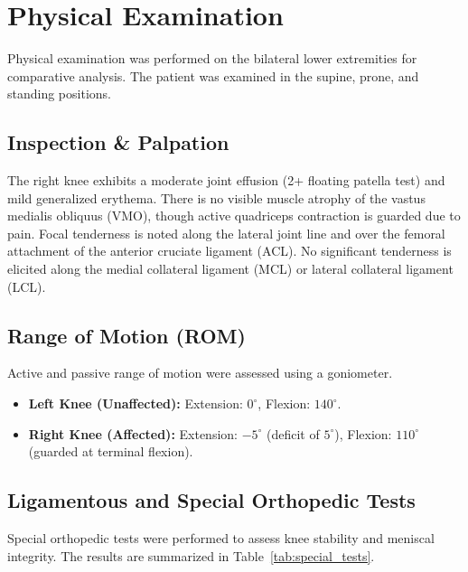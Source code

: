 \section{Physical Examination}
\label{sec:phys_exam}

Physical examination was performed on the bilateral lower extremities for comparative analysis. The patient was examined in the supine, prone, and standing positions.

\subsection{Inspection \& Palpation}
The right knee exhibits a moderate joint effusion (2+ floating patella test) and mild generalized erythema. There is no visible muscle atrophy of the vastus medialis obliquus (VMO), though active quadriceps contraction is guarded due to pain. Focal tenderness is noted along the lateral joint line and over the femoral attachment of the anterior cruciate ligament (ACL). No significant tenderness is elicited along the medial collateral ligament (MCL) or lateral collateral ligament (LCL).

\subsection{Range of Motion (ROM)}
Active and passive range of motion were assessed using a goniometer.
\begin{itemize}
  \item \textbf{Left Knee (Unaffected):} Extension: $0^\circ$, Flexion: $140^\circ$.
  \item \textbf{Right Knee (Affected):} Extension: $-5^\circ$ (deficit of $5^\circ$), Flexion: $110^\circ$ (guarded at terminal flexion).
\end{itemize}

\subsection{Ligamentous and Special Orthopedic Tests}
Special orthopedic tests were performed to assess knee stability and meniscal integrity. The results are summarized in Table~\ref{tab:special_tests}.

